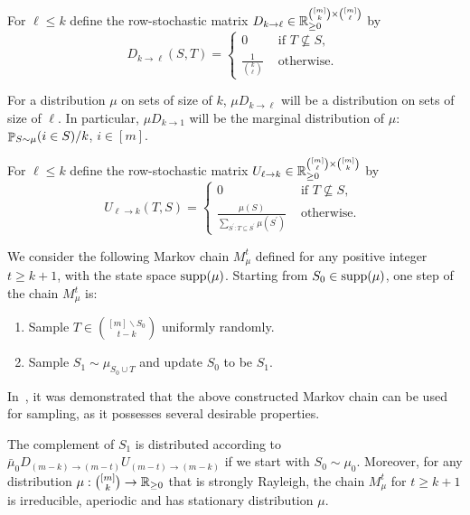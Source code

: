 \documentclass[11pt]{article}
\newcommand{\parens}[1]{( #1 )}
\newcommand{\sqb}[1]{\left[ #1 \right]}
\begin{document}
{\begin{definition}
For $\ell \leq k$ define the row-stochastic matrix $D_{k \to \ell}\in \RR_{\geq 0}^{\binom{\sqb{m}}{k}\times \binom{\sqb{m}}{\ell}}$ by
\begin{equation*}
	D_{k \to \ell}\parens{S,T}=\begin{cases}
		0 & \text{ if } T \nsubseteq S,\\
		\frac{1 }{\binom{k}{\ell}} & \text{ otherwise. }
	\end{cases}
\end{equation*}
\end{definition}
For a distribution $\mu$ on sets of size of $k$, $\mu D_{k \to \ell}$ will be a distribution on sets of size of $\ell$. In particular, $\mu D_{k \to 1}$ will be the marginal distribution of $\mu$: $\pb_{S\sim\mu}\parens{i\in S}/k$, $i \in \sqb{m}$.
\begin{definition}[Up operator] For $\ell \leq k$ define the row-stochastic matrix $U_{\ell \to k}\in \RR_{\geq 0}^{\binom{\sqb{m}}{\ell}\times \binom{\sqb{m}}{k}}$ by
\begin{equation*}
		U_{\ell \to k}\parens{T,S}=\begin{cases}
		0 & \text{ if } T \nsubseteq S,\\
		\frac{\mu\parens{S}}{\sum_{S^\prime : T\subseteq S^\prime}\mu \parens{S^\prime} } & \text{ otherwise. }
	\end{cases}
\end{equation*}
\end{definition}
We consider the following Markov chain $M_{\mu}^t$ defined for any positive integer $t\geq k+1$, with the state space $\supp\parens{\mu}$. Starting from $S_0 \in \supp\parens{\mu}$, one step of the chain $M_{\mu}^t$ is:
\begin{enumerate}
	\item Sample $T\in \binom{\sqb{m}\smallsetminus S_0}{t -k}$  uniformly randomly.
	\item Sample $S_1\sim \mu_{S_0 \cup T}$ and update $S_0$ to be $S_1$.
\end{enumerate}

In~\cite{anari2021domain, ALV22}, it was demonstrated that the above constructed Markov chain can be used for sampling, as it possesses several desirable properties.

\begin{proposition}\label{prop:complement-down-up-chain}
The complement of $S_1$ is distributed according to $\bar\mu_0 D_{\parens{m -k}\to \parens{m-t}} U _{\parens{m -t}\to \parens{m-k}}$ if we start with $S_0 \sim \mu_0$. Moreover, for any distribution $\mu: \binom{\sqb{m}}{k}\rightarrow \RR_{\geq 0}$ that is strongly Rayleigh, the chain $M_\mu^t$ for $t \geq k+1$ is irreducible, aperiodic and has stationary distribution $\mu$.
\end{proposition}




}
\end{document}
